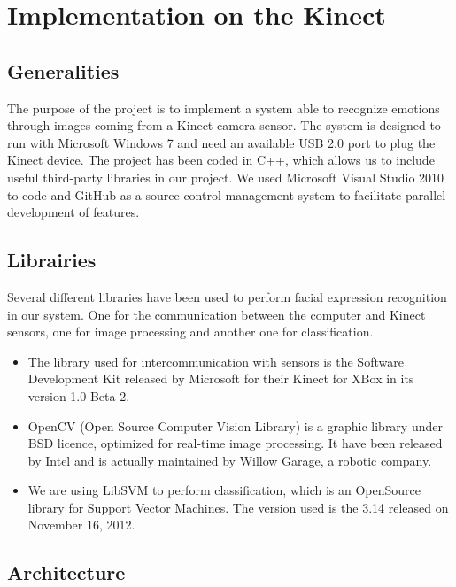\chapter{Implementation on the Kinect}
\label{chap:implementation_kinect}

\section{Generalities}
\vspace{\baselineskip}
\noindent The purpose of the project is to implement a system able to recognize emotions through images coming from a Kinect camera sensor. The system is designed to run with Microsoft Windows 7 and need an available USB 2.0 port to plug the Kinect device. The project has been coded in C++, which allows us to include useful third-party libraries in our project.
\newline We used Microsoft Visual Studio 2010 to code and GitHub as a source control management system to facilitate parallel development of features.

\section{Librairies}
\vspace{\baselineskip}
\noindent Several different libraries have been used to perform facial expression recognition in our system. One for the communication between the computer and Kinect sensors, one for image processing and another one for classification.


\begin{itemize}
  \item The library used for intercommunication with sensors is the Software Development Kit released by Microsoft for their Kinect for XBox in its version 1.0 Beta 2.
  \item OpenCV (Open Source Computer Vision Library) is a graphic library under BSD licence, optimized for real-time image processing. It have been released by Intel and is actually maintained by Willow Garage, a robotic company.
  \item We are using LibSVM to perform classification, which is an OpenSource library for Support Vector Machines. The version used is the 3.14 released on November 16, 2012.
\end{itemize}

\section{Architecture}

